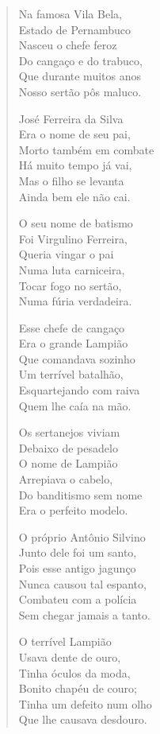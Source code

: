 \begin{verse}
Na famosa Vila Bela,\\
Estado de Pernambuco\\
Nasceu o chefe feroz\\
Do cangaço e do trabuco,\\
Que durante muitos anos\\
Nosso sertão pôs maluco.

José Ferreira da Silva\\
Era o nome de seu pai,\\
Morto também em combate\\
Há muito tempo já vai,\\
Mas o filho se levanta\\
Ainda bem ele não cai.

O seu nome de batismo\\
Foi Virgulino Ferreira,\\
Queria vingar o pai\\
Numa luta carniceira,\\
Tocar fogo no sertão,\\
Numa fúria verdadeira.
\pagebreak

Esse chefe de cangaço\\
Era o grande Lampião\\
Que comandava sozinho\\
Um terrível batalhão,\\
Esquartejando com raiva\\
Quem lhe caía na mão.

Os sertanejos viviam\\
Debaixo de pesadelo\\
O nome de Lampião\\
Arrepiava o cabelo,\\
Do banditismo sem nome\\
Era o perfeito modelo.

O próprio Antônio Silvino\\
Junto dele foi um santo,\\
Pois esse antigo jagunço \\
Nunca causou tal espanto,\\
Combateu com a polícia\\
Sem chegar jamais a tanto.

O terrível Lampião\\
Usava dente de ouro,\\
Tinha óculos da moda,\\
Bonito chapéu de couro;\\
Tinha um defeito num olho\\
Que lhe causava desdouro.
\pagebreak


\end{verse}
